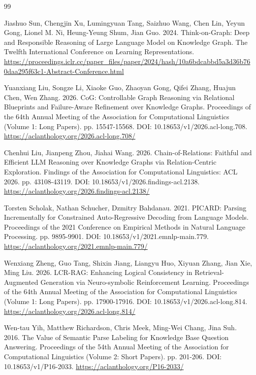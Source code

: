 \documentclass[10pt]{article}
\begin{document}
\begin{thebibliography}{99}

 Jiashuo Sun, Chengjin Xu, Lumingyuan Tang, Saizhuo Wang, Chen Lin, Yeyun Gong, Lionel M. Ni, Heung-Yeung Shum, Jian Guo. 2024. Think-on-Graph: Deep and Responsible Reasoning of Large Language Model on Knowledge Graph. The Twelfth International Conference on Learning Representations. \url{https://proceedings.iclr.cc/paper_files/paper/2024/hash/10a6bdcabbd5a3d36b760daa295f63c1-Abstract-Conference.html}

 Yuanxiang Liu, Songze Li, Xiaoke Guo, Zhaoyan Gong, Qifei Zhang, Huajun Chen, Wen Zhang. 2026. CoG: Controllable Graph Reasoning via Relational Blueprints and Failure-Aware Refinement over Knowledge Graphs. Proceedings of the 64th Annual Meeting of the Association for Computational Linguistics (Volume 1: Long Papers). pp. 15547-15568. DOI: 10.18653/v1/2026.acl-long.708. \url{https://aclanthology.org/2026.acl-long.708/}

 Chenhui Liu, Jianpeng Zhou, Jiahai Wang. 2026. Chain-of-Relations: Faithful and Efficient LLM Reasoning over Knowledge Graphs via Relation-Centric Exploration. Findings of the Association for Computational Linguistics: ACL 2026. pp. 43108-43119. DOI: 10.18653/v1/2026.findings-acl.2138. \url{https://aclanthology.org/2026.findings-acl.2138/}

 Torsten Scholak, Nathan Schucher, Dzmitry Bahdanau. 2021. PICARD: Parsing Incrementally for Constrained Auto-Regressive Decoding from Language Models. Proceedings of the 2021 Conference on Empirical Methods in Natural Language Processing. pp. 9895-9901. DOI: 10.18653/v1/2021.emnlp-main.779. \url{https://aclanthology.org/2021.emnlp-main.779/}

 Wenxiang Zheng, Guo Tang, Shixin Jiang, Liangyu Huo, Xiyuan Zhang, Jian Xie, Ming Liu. 2026. LCR-RAG: Enhancing Logical Consistency in Retrieval-Augmented Generation via Neuro-symbolic Reinforcement Learning. Proceedings of the 64th Annual Meeting of the Association for Computational Linguistics (Volume 1: Long Papers). pp. 17900-17916. DOI: 10.18653/v1/2026.acl-long.814. \url{https://aclanthology.org/2026.acl-long.814/}

 Wen-tau Yih, Matthew Richardson, Chris Meek, Ming-Wei Chang, Jina Suh. 2016. The Value of Semantic Parse Labeling for Knowledge Base Question Answering. Proceedings of the 54th Annual Meeting of the Association for Computational Linguistics (Volume 2: Short Papers). pp. 201-206. DOI: 10.18653/v1/P16-2033. \url{https://aclanthology.org/P16-2033/}


\end{thebibliography}
\end{document}

